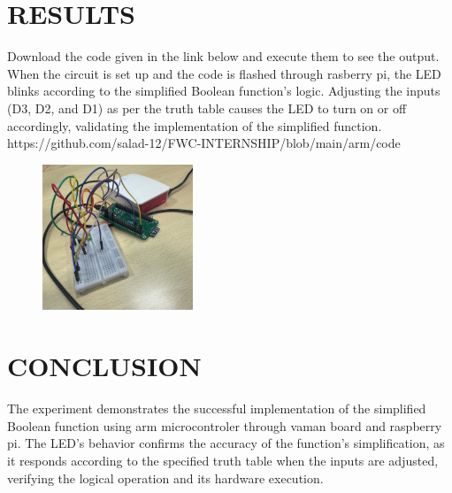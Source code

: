 \documentclass[conference]{IEEEtran}
\begin{document}
\section{RESULTS}
Download the code given in the link below and execute them to see the output. When the circuit is set up and the code is flashed through rasberry pi, the LED blinks according to the simplified Boolean function’s logic. Adjusting the inputs (D3, D2, and D1) as per the truth table causes the LED to turn on or off accordingly, validating the implementation of the simplified function.
https://github.com/salad-12/FWC-INTERNSHIP/blob/main/arm/code
\begin{figure}[h] 
 \centering 
 \includegraphics[width=0.4\textwidth]{arm.jpg}
 \caption{\label{fig:1}}    
\end{figure}
\section{CONCLUSION}
The experiment demonstrates the successful implementation of the simplified Boolean function using arm microcontroler through vaman board and raspberry pi. The LED’s behavior confirms the accuracy of the function's simplification, as it responds according to the specified truth table when the inputs are adjusted, verifying the logical operation and its hardware execution.
\end{document}
